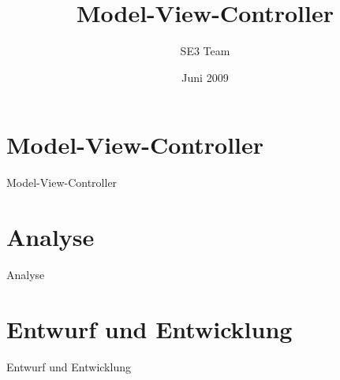 \documentclass{beamer}
\title{\bf Model-View-Controller}
\author{SE3 Team}
\date{Juni 2009}
\newcommand{\sectionframe}[1]
{
\section{#1}
\begin{frame}
    \vspace{1cm}
    \begin{center}
        \begin{LARGE}
            #1
        \end{LARGE}
    \end{center}
\end{frame}
}
\begin{document}
\frame{\titlepage}

\frame{\vspace{1cm}\tableofcontents}

\sectionframe{Model-View-Controller}



\sectionframe{Analyse}



\sectionframe{Entwurf und Entwicklung}


\end{document}
